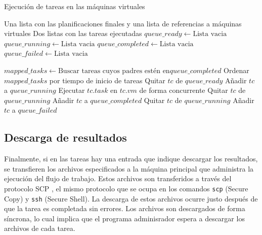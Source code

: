 \begin{algorithm}
\caption{Ejecuci\'on de tareas en las m\'aquinas virtuales}
\label{alg_manage_execution}
\begin{algorithmic}
\Require Una lista con las planificaciones finales y una lista de referencias a m\'aquinas virtuales
\Ensure Dos listas con las tareas ejecutadas
    \State $queue\_ready \gets \text{Lista vacia}$
    \State $queue\_running \gets \text{Lista vacia}$
    \State $queue\_completed \gets \text{Lista vacia}$
    \State $queue\_failed \gets \text{Lista vacia}$

    \EndFor

        \State $mapped\_tasks \gets \text{Buscar tareas cuyos padres est\'en en} queue\_completed$
        \State Ordenar $mapped\_tasks$ por tiempo de inicio de tareas
            \State Quitar $tc$ de $queue\_ready$
            \State Añadir $tc$ a $queue\_running$
            \State Ejecutar $tc.task$ en $tc.vm$ de forma concurrente
        \EndFor
                \State Quitar $tc$ de $queue\_running$
                \State Añadir $tc$ a $queue\_completed$
                \State Quitar $tc$ de $queue\_running$
                \State Añadir $tc$ a $queue\_failed$
            \EndIf
        \EndFor
    \EndWhile
\EndProcedure
\end{algorithmic}
\end{algorithm}


\subsection{Descarga de resultados}

Finalmente, si en las tareas hay una entrada que indique descargar los resultados, se transfieren los archivos especificados a la máquina principal que administra la ejecuci\'on del flujo de trabajo. Estos archivos son transferidos a trav\'es del protocolo SCP \cite{rfc4251}, el mismo protocolo que se ocupa en los comandos \texttt{scp} (Secure Copy) y \texttt{ssh} (Secure Shell). La descarga de estos archivos ocurre justo despu\'es de que la tarea es completada sin errores. Los archivos son descargados de forma s\'incrona, lo cual implica que el programa adminisrador espera a descargar los archivos de cada tarea.


